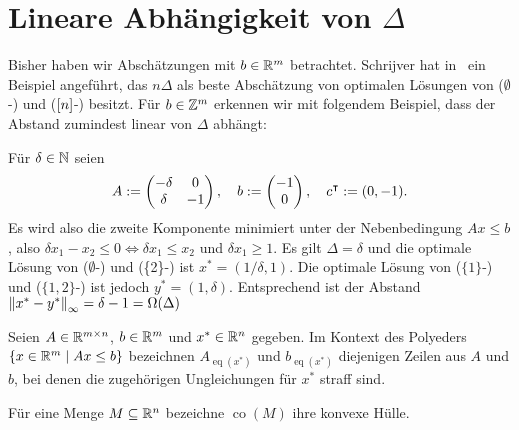 \newcommand{\one}{\mathbbm{1}}
\newcommand{\eq}[1]{{\operatorname{eq}(#1)}}
\newcommand{\co}[1]{\operatorname{co}(#1)}

\section{Lineare Abhängigkeit von $\Delta$}\label{sec:linear}

Bisher haben wir Abschätzungen mit $b\in\mathbb{R}^m$ betrachtet.
Schrijver hat in~\cite[Kapitel~17.2]{Schrijver1986} ein Beispiel angeführt, das $n\Delta$ als beste Abschätzung von optimalen Lösungen von ($\emptyset$-\MIPR) und ($[n]$-\MIPR) besitzt.
Für $b\in\mathbb{Z}^m$ erkennen wir mit folgendem Beispiel, dass der Abstand zumindest linear von $\Delta$ abhängt:
\begin{example}
	Für $\delta\in\mathbb{N}$ seien
	$$A:=
	\begin{pmatrix}
	-\delta & 0  \\
	\delta  & -1
	\end{pmatrix},\quad
	b:=\begin{pmatrix} -1 \\ 0 \end{pmatrix},\quad
	c^\intercal:=(0, -1).
	$$
	Es wird also die zweite Komponente minimiert unter der Nebenbedingung $Ax\leq b$, also $\delta x_1-x_2\leq0\Leftrightarrow\delta x_1\leq x_2$ und $\delta x_1\geq 1$.
	Es gilt $\Delta=\delta$ und die optimale Lösung von ($\emptyset$-\MIPI) und (\{2\}-\MIPI) ist $x^*=(1/\delta,1)$.
	Die optimale Lösung von ($\{1\}$-\MIPI) und ($\{1, 2\}$-\MIPI) ist jedoch $y^*=(1,\delta)$.
	Entsprechend ist der Abstand $\left\lVert x^*-y^*\right\rVert_\infty=\delta-1=\Omega(\Delta)$
\end{example}

\begin{notation}
	Seien $A\in\mathbb{R}^{m\times n}$, $b\in\mathbb{R}^m$ und $x^*\in\mathbb{R}^n$ gegeben.
	Im Kontext des Polyeders $\{ x\in\mathbb{R}^m \mid Ax\leq b \}$ bezeichnen
	$A_\eq{x^*}$ und $b_\eq{x^*}$ diejenigen Zeilen aus $A$ und $b$, bei denen die zugehörigen Ungleichungen für $x^*$ straff sind.
	
	Für eine Menge $M\subseteq \mathbb{R}^n$ bezeichne $\co{M}$ ihre konvexe Hülle.
\end{notation}

